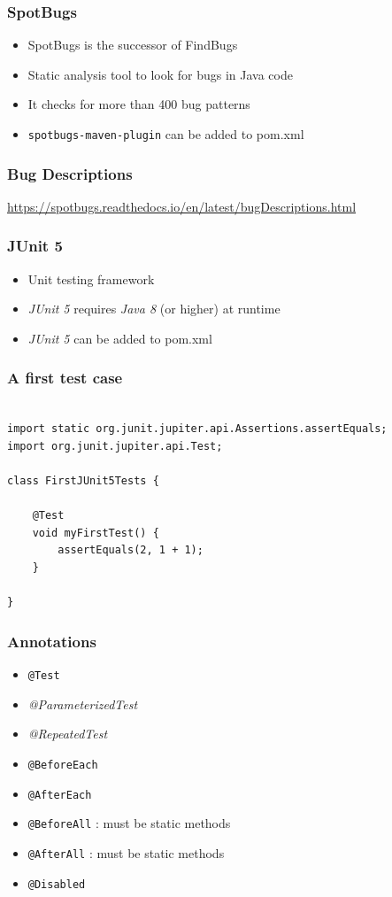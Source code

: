 \documentclass{beamer}
\begin{document}
\begin{frame}[fragile]
\frametitle{SpotBugs}

\begin{itemize}
\item SpotBugs is the successor of FindBugs
\item Static analysis tool to look for bugs in Java code
\item It checks for more than 400 bug patterns
\item \texttt{spotbugs-maven-plugin} can be added to pom.xml
\end{itemize}

\end{frame}


\begin{frame}[fragile]
\frametitle{Bug Descriptions}

\url{https://spotbugs.readthedocs.io/en/latest/bugDescriptions.html}


\end{frame}


\begin{frame}[fragile]
\frametitle{JUnit 5}

\begin{itemize}
\item Unit testing framework
\item \textit{JUnit 5} requires \textit{Java 8} (or higher) at runtime
\item \textit{JUnit 5} can be added to pom.xml
\end{itemize}

\end{frame}


\begin{frame}[fragile]
\frametitle{A first test case}

\begin{lstlisting}

import static org.junit.jupiter.api.Assertions.assertEquals;
import org.junit.jupiter.api.Test;

class FirstJUnit5Tests {

    @Test
    void myFirstTest() {
        assertEquals(2, 1 + 1);
    }

}
\end{lstlisting}
\end{frame}


\begin{frame}[fragile]
\frametitle{Annotations}

\begin{itemize}
\item \texttt{@Test}
\item \textit{@ParameterizedTest}
\item \textit{@RepeatedTest}
\item \texttt{@BeforeEach}
\item \texttt{@AfterEach}
\item \texttt{@BeforeAll}  : must be static methods
\item \texttt{@AfterAll}   : must be static methods
\item \texttt{@Disabled}
\end{itemize}

\end{frame}
\end{document}
